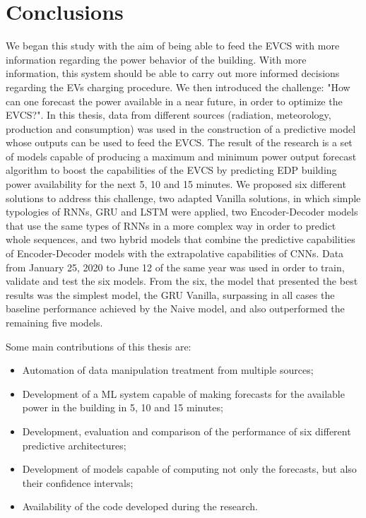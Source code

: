\cleardoublepage
\label{chap:conclusion}

\section{Conclusions}

We began this study with the aim of being able to feed the \ac{EVCS} with more information regarding the power behavior of the building. With more information, this system should be able to carry out more informed decisions regarding the \ac{EV}s charging procedure. We then introduced the challenge: "How can one forecast the power available in a near future, in order to optimize the \ac{EVCS}?". In this thesis, data from different sources (radiation, meteorology, production and consumption) was used in the construction of a predictive model whose outputs can be used to feed the \ac{EVCS}. The result of the research is a set of models capable of producing a maximum and minimum power output forecast algorithm to boost the capabilities of the \ac{EVCS} by predicting \ac{EDP} building power availability for the next 5, 10 and 15 minutes. We proposed six different solutions to address this challenge, two adapted Vanilla solutions, in which simple typologies of \ac{RNN}s, \ac{GRU} and \ac{LSTM} were applied, two Encoder-Decoder models that use the same types of \ac{RNN}s in a more complex way in order to predict whole sequences, and two hybrid models that combine the predictive capabilities of Encoder-Decoder models with the extrapolative capabilities of \ac{CNN}s. Data from January 25, 2020 to June 12 of the same year was used in order to train, validate and test the six models. From the six, the model that presented the best results was the simplest model, the \ac{GRU} Vanilla, surpassing in all cases the baseline performance achieved by the Naive model, and also outperformed the remaining five models.

Some main contributions of this thesis are:
\begin{itemize}
\setlength\itemsep{0.1em}
    \item Automation of data manipulation treatment from multiple sources;
    \item Development of a \ac{ML} system capable of making forecasts for the available power in the building in 5, 10 and 15 minutes;
    \item Development, evaluation and comparison of the performance of six different predictive architectures;
    \item Development of models capable of computing not only the forecasts, but also their confidence intervals;
    \item Availability of the code developed during the research.
    
\end{itemize}

